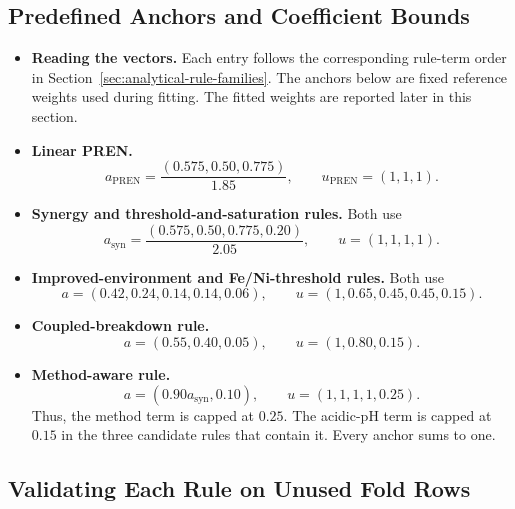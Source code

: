 \documentclass[11pt]{article}
\newenvironment{notes}
  {\begin{itemize}\setlength{\itemsep}{0.45em}\setlength{\parsep}{0pt}}
  {\end{itemize}}
\begin{document}
\subsection{Predefined Anchors and Coefficient Bounds}
\label{sec:calibration-anchors}

\begin{notes}
    \item \textbf{Reading the vectors.}
    Each entry follows the corresponding rule-term order in
    Section~\ref{sec:analytical-rule-families}.
    The anchors below are fixed reference weights used during
    fitting. The fitted weights are reported later in this section.

    \item \textbf{Linear PREN.}
    \[
        a_{\mathrm{PREN}}
        =\frac{(0.575,0.50,0.775)}{1.85},
        \qquad
        u_{\mathrm{PREN}}=(1,1,1).
    \]

    \item \textbf{Synergy and threshold-and-saturation rules.}
    Both use
    \[
        a_{\mathrm{syn}}
        =\frac{(0.575,0.50,0.775,0.20)}{2.05},
        \qquad
        u=(1,1,1,1).
    \]

    \item \textbf{Improved-environment and Fe/Ni-threshold rules.}
    Both use
    \[
        a=(0.42,0.24,0.14,0.14,0.06),
        \qquad
        u=(1,0.65,0.45,0.45,0.15).
    \]

    \item \textbf{Coupled-breakdown rule.}
    \[
        a=(0.55,0.40,0.05),
        \qquad
        u=(1,0.80,0.15).
    \]

    \item \textbf{Method-aware rule.}
    \[
        a=(0.90a_{\mathrm{syn}},0.10),
        \qquad
        u=(1,1,1,1,0.25).
    \]
    Thus, the method term is capped at \(0.25\).
    The acidic-pH term is capped at \(0.15\) in the three
    candidate rules that contain it. Every anchor sums to one.
\end{notes}


\subsection{Validating Each Rule on Unused Fold Rows}
\label{sec:direct-rule-validation}
\end{document}
